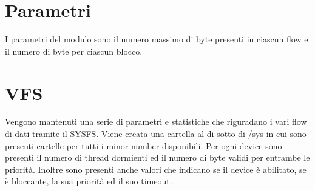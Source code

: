 \documentclass[a4paper,10pt]{article}
\begin{document}
\section{Parametri}
I parametri del modulo sono il numero massimo di byte presenti in ciascun flow e il numero di byte per ciascun blocco.

\section{VFS}
Vengono mantenuti una serie di parametri e statistiche che riguradano i vari flow di dati tramite il SYSFS. Viene creata una cartella al di sotto di /sys in cui sono presenti cartelle per tutti i minor number disponibili. Per ogni device sono presenti il numero di thread dormienti ed il numero di byte validi per entrambe le priorità. Inoltre sono presenti anche valori che indicano se il device è abilitato, se è bloccante, la sua priorità ed il suo timeout.
\end{document}
